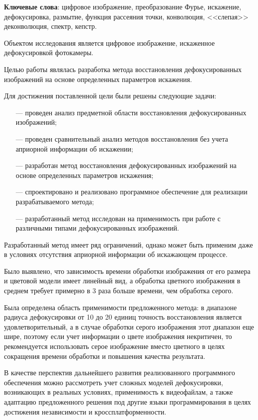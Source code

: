 \begin{essay}{}
    \noindent\textbf{Ключевые слова}: цифровое изображение, преобразование Фурье, искажение, дефокусировка, размытие, функция рассеяния точки, конволюция, <<слепая>> деконволюция, спектр, кепстр.

    Объектом исследования является цифровое изображение, искаженное дефокусировкой фотокамеры.
    
    Целью работы являлась разработка метода восстановления дефокусированных изображений на основе определенных параметров искажения. 
    
    Для достижения поставленной цели были решены следующие задачи:
    
    \begin{itemize}
    	\item[---] проведен анализ предметной области восстановления дефокусированных изображений;
    	\item[---] проведен сравнительный анализ методов восстановления без учета априорной информации об искажении;
    	\item[---] разработан метод восстановления дефокусированных изображений на основе определенных параметров искажения;
    	\item[---] спроектировано и реализовано программное обеспечение для реализации разрабатываемого метода;
    	\item[---] разработанный метод исследован на применимость при работе с различными типами дефокусированных изображений. 
    \end{itemize}
    
    Разработанный метод имеет ряд ограничений, однако может быть применим даже в условиях отсутствия априорной информации об искажающем процессе.
    
    Было выявлено, что зависимость времени обработки изображения от его размера и цветовой модели имеет линейный вид, а обработка цветного изображения в среднем требует примерно в 3 раза больше времени, чем обработка серого. 
    
    Была определена область применимости предложенного метода: в диапазоне радиуса дефокусировки от 10 до 20 единиц точность восстановления является удовлетворительный, а в случае обработки серого изображения этот диапазон еще шире, поэтому если учет информации о цвете изображения некритичен, то рекомендуется использовать серое изображение вместо цветного в целях сокращения времени обработки и повышения качества результата.
    
    В качестве перспектив дальнейшего развития реализованного программного обеспечения можно рассмотреть учет сложных моделей дефокусировки, возникающих в реальных условиях, применимость к видеофайлам, а также адаптацию предложенного решения под другие языки программирования в целях достижения независимости и кроссплатформенности.
\end{essay}
